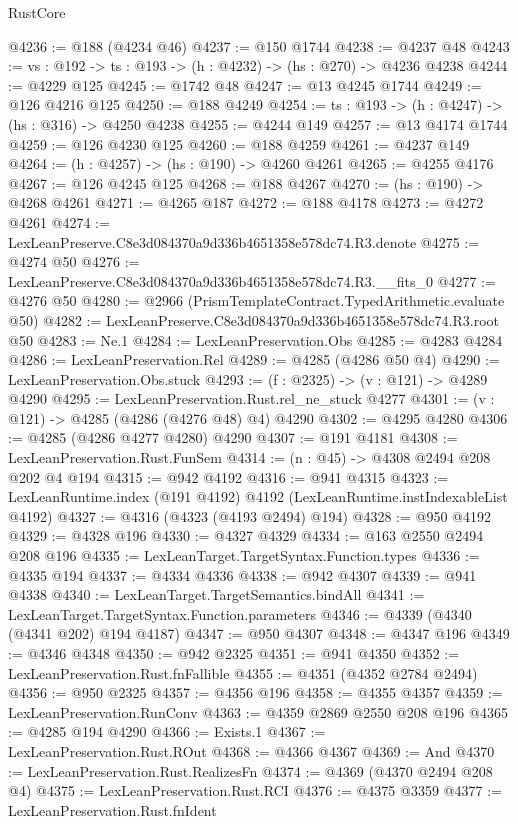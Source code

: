 \begin{lexlean}{RustCore}
\begin{coremodule}
@4236 := @188 (@4234 @46)
@4237 := @150 @1744
@4238 := @4237 @48
@4243 := {vs : @192} -> {ts : @193} -> (h : @4232) -> (hs : @270) -> @4236 @4238
@4244 := @4229 @125
@4245 := @1742 @48
@4247 := @13 @4245 @1744
@4249 := @126 @4216 @125
@4250 := @188 @4249
@4254 := {ts : @193} -> (h : @4247) -> (hs : @316) -> @4250 @4238
@4255 := @4244 @149
@4257 := @13 @4174 @1744
@4259 := @126 @4230 @125
@4260 := @188 @4259
@4261 := @4237 @149
@4264 := (h : @4257) -> (hs : @190) -> @4260 @4261
@4265 := @4255 @4176
@4267 := @126 @4245 @125
@4268 := @188 @4267
@4270 := (hs : @190) -> @4268 @4261
@4271 := @4265 @187
@4272 := @188 @4178
@4273 := @4272 @4261
@4274 := LexLeanPreserve.C8e3d084370a9d336b4651358e578dc74.R3.denote
@4275 := @4274 @50
@4276 := LexLeanPreserve.C8e3d084370a9d336b4651358e578dc74.R3.__fits_0
@4277 := @4276 @50
@4280 := @2966 (PrismTemplateContract.TypedArithmetic.evaluate @50)
@4282 := LexLeanPreserve.C8e3d084370a9d336b4651358e578dc74.R3.root @50
@4283 := Ne.{1}
@4284 := LexLeanPreservation.Obs
@4285 := @4283 @4284
@4286 := LexLeanPreservation.Rel
@4289 := @4285 (@4286 @50 @4)
@4290 := LexLeanPreservation.Obs.stuck
@4293 := (f : @2325) -> (v : @121) -> @4289 @4290
@4295 := LexLeanPreservation.Rust.rel_ne_stuck @4277
@4301 := (v : @121) -> @4285 (@4286 (@4276 @48) @4) @4290
@4302 := @4295 @4280
@4306 := @4285 (@4286 @4277 @4280) @4290
@4307 := @191 @4181
@4308 := LexLeanPreservation.Rust.FunSem
@4314 := (n : @45) -> @4308 @2494 @208 @202 @4 @194
@4315 := @942 @4192
@4316 := @941 @4315
@4323 := LexLeanRuntime.index (@191 @4192) @4192 (LexLeanRuntime.instIndexableList @4192)
@4327 := @4316 (@4323 (@4193 @2494) @194)
@4328 := @950 @4192
@4329 := @4328 @196
@4330 := @4327 @4329
@4334 := @163 @2550 @2494 @208 @196
@4335 := LexLeanTarget.TargetSyntax.Function.types
@4336 := @4335 @194
@4337 := @4334 @4336
@4338 := @942 @4307
@4339 := @941 @4338
@4340 := LexLeanTarget.TargetSemantics.bindAll
@4341 := LexLeanTarget.TargetSyntax.Function.parameters
@4346 := @4339 (@4340 (@4341 @202) @194 @4187)
@4347 := @950 @4307
@4348 := @4347 @196
@4349 := @4346 @4348
@4350 := @942 @2325
@4351 := @941 @4350
@4352 := LexLeanPreservation.Rust.fnFallible
@4355 := @4351 (@4352 @2784 @2494)
@4356 := @950 @2325
@4357 := @4356 @196
@4358 := @4355 @4357
@4359 := LexLeanPreservation.RunConv
@4363 := @4359 @2869 @2550 @208 @196
@4365 := @4285 @194 @4290
@4366 := Exists.{1}
@4367 := LexLeanPreservation.Rust.ROut
@4368 := @4366 @4367
@4369 := And
@4370 := LexLeanPreservation.Rust.RealizesFn
@4374 := @4369 (@4370 @2494 @208 @4)
@4375 := LexLeanPreservation.Rust.RCI
@4376 := @4375 @3359
@4377 := LexLeanPreservation.Rust.fnIdent

\end{coremodule}
\end{lexlean}
